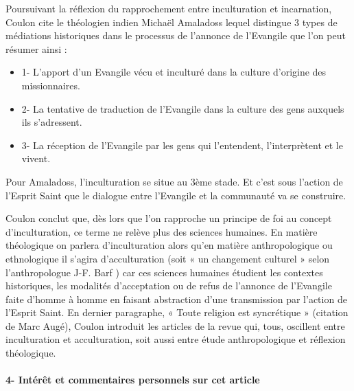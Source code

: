 Poursuivant la réflexion du rapprochement entre inculturation et incarnation, Coulon cite le théologien indien Michaël Amaladoss lequel distingue 3 types de médiations historiques dans le processus de l’annonce de l’Evangile que l’on peut résumer ainsi : 

\begin{itemize}
    \item 1-	L’apport d’un Evangile vécu et inculturé dans la culture d’origine des missionnaires.
    \item 2-	La tentative de traduction de l’Evangile dans la culture des gens auxquels ils s’adressent.
    \item 3-	La réception de l’Evangile par les gens qui l’entendent, l’interprètent et le vivent. 
\end{itemize}

Pour Amaladoss, l’inculturation se situe au 3ème stade. Et c’est sous l’action de l’Esprit Saint que le dialogue entre l’Evangile et la communauté va se construire. 

Coulon conclut que, dès lors que l’on rapproche un principe de foi au concept d’inculturation, ce terme ne relève plus des sciences humaines. En matière théologique on parlera d’inculturation alors qu’en matière anthropologique ou ethnologique il s’agira d’acculturation (soit « un changement culturel » selon l’anthropologue J-F. Barf ) car ces sciences humaines étudient les contextes historiques, les modalités d’acceptation ou de refus de l’annonce de l’Evangile faite d’homme à homme en faisant abstraction d’une transmission par l’action de l’Esprit Saint. 
En dernier paragraphe, « Toute religion est syncrétique » (citation de Marc Augé), Coulon introduit les articles de la revue qui, tous, oscillent entre inculturation et acculturation, soit aussi entre étude anthropologique et réflexion théologique. 


\paragraph{4-	Intérêt et commentaires personnels sur cet article }

